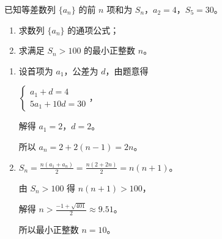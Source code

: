 \documentclass{exam-zh}
\begin{document}
\begin{problem}[points = 12]
  已知等差数列 $\{a_n\}$ 的前 $n$ 项和为 $S_n$，$a_2 = 4$，$S_5 = 30$。

  \begin{enumerate}
    \item 求数列 $\{a_n\}$ 的通项公式；
    \item 求满足 $S_n > 100$ 的最小正整数 $n$。
  \end{enumerate}

  \begin{solution}
    \begin{enumerate}
      \item 设首项为 $a_1$，公差为 $d$，由题意得

      $\begin{cases} a_1 + d = 4 \\ 5a_1 + 10d = 30 \end{cases}$，

      解得 $a_1 = 2$，$d = 2$。

      所以 $a_n = 2 + 2(n - 1) = 2n$。

      \item $S_n = \frac{n(a_1 + a_n)}{2} = \frac{n(2 + 2n)}{2} = n(n + 1)$。

      由 $S_n > 100$ 得 $n(n + 1) > 100$，

      解得 $n > \frac{-1 + \sqrt{401}}{2} \approx 9.51$。

      所以最小正整数 $n = 10$。
    \end{enumerate}
  \end{solution}
\end{problem}
\end{document}
